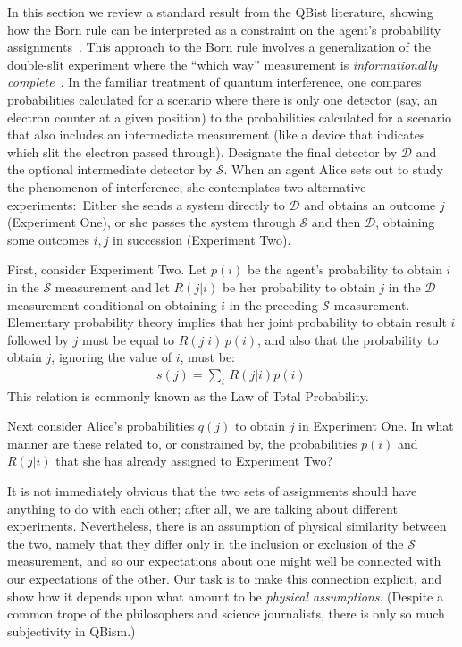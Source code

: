 \documentclass[%
 reprint,superscriptaddress,
 amsmath,amssymb,
 aps,twocolumn,pra
]{revtex4-1}
\newcommand{\eqn}[1]{\begin{eqnarray} #1 \end{eqnarray}}
\newcommand{\tit}[1]{\textit{#1}}
\newcommand{\zum}[2]{\displaystyle\sum_{#1}^{#2}}
\newcommand{\onestage}{{One}}
\newcommand{\twostage}{{Two}}
\begin{document}
In this section we review a standard result from the QBist literature, showing how the Born rule can be interpreted as a constraint on the agent's probability assignments~\cite{Fuchs13a,Fuchs15b}. This approach to the Born rule involves a generalization of the double-slit experiment where the ``which way'' measurement is \tit{informationally complete}~\cite{DeBrota20a,DeBrota21}. In the familiar treatment of quantum interference, one compares probabilities calculated for a scenario where there is only one detector (say, an electron counter at a given position) to the probabilities calculated for a scenario that also includes an intermediate measurement (like a device that indicates which slit the electron passed through). Designate the final detector by $\mathcal{D}$ and the optional intermediate detector by $\mathcal{S}$. When an agent Alice sets out to study the phenomenon of interference, she contemplates two alternative experiments:\ Either she sends a system directly to $\mathcal{D}$ and obtains an outcome $j$ (Experiment \onestage), or she passes the system through $\mathcal{S}$ and then $\mathcal{D}$, obtaining some outcomes $i,j$ in succession (Experiment \twostage).

First, consider Experiment \twostage. Let $p(i)$ be the agent's probability to obtain $i$ in the $\mathcal{S}$ measurement and let $R(j|i)$ be her probability to obtain $j$ in the $\mathcal{D}$ measurement conditional on obtaining $i$ in the preceding $\mathcal{S}$ measurement. Elementary probability theory implies that her joint probability to obtain result $i$ followed by $j$ must be equal to $R(j|i)\, p(i)$, and also that the probability to obtain $j$, ignoring the value of $i$, must be:
\eqn{
s(j) = \zum{i}{}\, R(j|i)p(i) \,
}
This relation is commonly known as the Law of Total Probability.

Next consider Alice's probabilities $q(j)$ to obtain $j$ in Experiment \onestage. In what manner are these related to, or constrained by, the probabilities $p(i)$ and $R(j|i)$ that she has already assigned to Experiment \twostage?

It is not immediately obvious that the two sets of assignments should have anything to do with each other; after all, we are talking about different experiments. Nevertheless, there is an assumption of physical similarity between the two, namely that they differ only in the inclusion or exclusion of the $\mathcal{S}$ measurement, and so our expectations about one might well be connected with our expectations of the other. Our task is to make this connection explicit, and show how it depends upon what amount to be \tit{physical assumptions}.  (Despite a common trope of the philosophers and science journalists, there is only so much subjectivity in QBism.)
\end{document}
